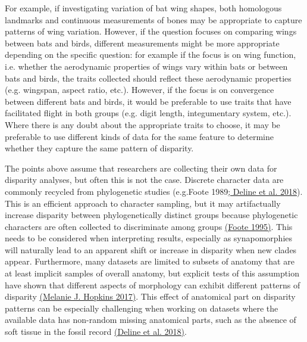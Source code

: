 \documentclass[12pt,letterpaper]{article}
\begin{document}
For example, if investigating variation of bat wing shapes, both homologous landmarks and continuous measurements of bones may be appropriate to capture patterns of wing variation.
However, if the question focuses on comparing wings between bats and birds, different measurements might be more appropriate depending on the specific question: for example if the focus is on wing function, i.e. whether the aerodynamic properties of wings vary within bats or between bats and birds, the traits collected should reflect these aerodynamic properties (e.g. wingspan, aspect ratio, etc.).
However, if the focus is on convergence between different bats and birds, it would be preferable to use traits that have facilitated flight in both groups (e.g. digit length, integumentary system, etc.).
Where there is any doubt about the appropriate traits to choose, it may be preferable to use different kinds of data for the same feature to determine whether they capture the same pattern of disparity.

The points above assume that researchers are collecting their own data for disparity analyses, but often this is not the case.
Discrete character data are commonly recycled from phylogenetic studies (e.g.Foote 1989\href{https://paperpile.com/c/sTGYvp/2Neu+0y4V}{; Deline et al. 2018}).
This is an efficient approach to character sampling, but it may artifactually increase disparity between phylogenetically distinct groups because phylogenetic characters are often collected to discriminate among groups \href{https://paperpile.com/c/sTGYvp/fTJ3}{(Foote 1995)}.
This needs to be considered when interpreting results, especially as synapomorphies will naturally lead to an apparent shift or increase in disparity when new clades appear.
Furthermore, many datasets are limited to subsets of anatomy that are at least implicit samples of overall anatomy, but explicit tests of this assumption have shown that different aspects of morphology can exhibit different patterns of disparity \href{https://paperpile.com/c/sTGYvp/xLdm}{(Melanie J. Hopkins 2017)}.
This effect of anatomical part on disparity patterns can be especially challenging when working on datasets where the available data has non-random missing anatomical parts, such as the absence of soft tissue in the fossil record \href{https://paperpile.com/c/sTGYvp/0y4V}{(Deline et al. 2018)}.
\end{document}
